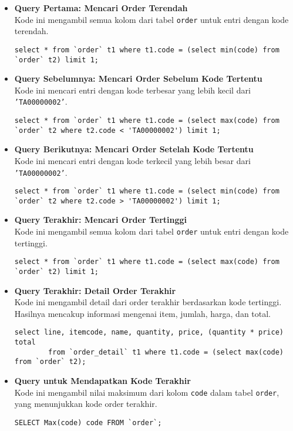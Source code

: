\begin{itemize}
	\item \textbf{Query Pertama: Mencari Order Terendah} \\
	Kode ini mengambil semua kolom dari tabel \texttt{order} untuk entri dengan kode terendah.
	\begin{lstlisting}[style=sql]
		select * from `order` t1 where t1.code = (select min(code) from `order` t2) limit 1;
	\end{lstlisting}
	
	\item \textbf{Query Sebelumnya: Mencari Order Sebelum Kode Tertentu} \\
	Kode ini mencari entri dengan kode terbesar yang lebih kecil dari \texttt{'TA00000002'}.
	\begin{lstlisting}[style=sql]
		select * from `order` t1 where t1.code = (select max(code) from `order` t2 where t2.code < 'TA00000002') limit 1;
	\end{lstlisting}
	
	\item \textbf{Query Berikutnya: Mencari Order Setelah Kode Tertentu} \\
	Kode ini mencari entri dengan kode terkecil yang lebih besar dari \texttt{'TA00000002'}.
	\begin{lstlisting}[style=sql]
		select * from `order` t1 where t1.code = (select min(code) from `order` t2 where t2.code > 'TA00000002') limit 1;
	\end{lstlisting}
	
	\item \textbf{Query Terakhir: Mencari Order Tertinggi} \\
	Kode ini mengambil semua kolom dari tabel \texttt{order} untuk entri dengan kode tertinggi.
	\begin{lstlisting}[style=sql]
		select * from `order` t1 where t1.code = (select max(code) from `order` t2) limit 1;
	\end{lstlisting}
	
	\item \textbf{Query Terakhir: Detail Order Terakhir} \\
	Kode ini mengambil detail dari order terakhir berdasarkan kode tertinggi. Hasilnya mencakup informasi mengenai item, jumlah, harga, dan total.
	\begin{lstlisting}[style=sql]
		select line, itemcode, name, quantity, price, (quantity * price) total 
		from `order_detail` t1 where t1.code = (select max(code) from `order` t2);
	\end{lstlisting}
	
	\item \textbf{Query untuk Mendapatkan Kode Terakhir} \\
	Kode ini mengambil nilai maksimum dari kolom \texttt{code} dalam tabel \texttt{order}, yang menunjukkan kode order terakhir.
	\begin{lstlisting}[style=sql]
		SELECT Max(code) code FROM `order`;
	\end{lstlisting}
\end{itemize}

